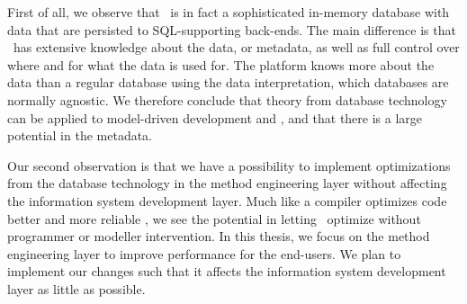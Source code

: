 First of all, we observe that \gap~is in fact a sophisticated in-memory database with data that are persisted to SQL-supporting back-ends. The main difference is that \gap~has extensive knowledge about the data, or metadata, as well as full control over where and for what the data is used for. The platform knows more about the data than a regular database using the data interpretation, which databases are normally agnostic. We therefore conclude that theory from database technology can be applied to model-driven development and \gap, and that there is a large potential in the metadata.

Our second observation is that we have a possibility to implement optimizations from the database technology in the method engineering layer without affecting the information system development layer. Much like a compiler optimizes code better and more reliable \cite{Selic2003-qa}, we see the potential in letting \gap~optimize without programmer or modeller intervention. In this thesis, we focus on the method engineering layer to improve performance for the end-users. We plan to implement our changes such that it affects the information system development layer as little as possible.
